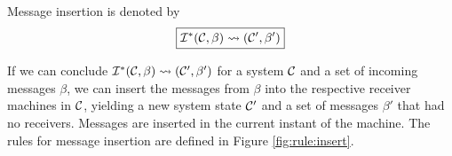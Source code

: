 \newpage

Message insertion is denoted by
\begin{equation*}
\boxed{\mathcal{I}^*(\mathcal{C}, \beta) \leadsto (\mathcal{C}', \beta')}
\end{equation*}

If we can conclude $\mathcal{I}^*(\mathcal{C}, \beta) \leadsto (\mathcal{C}', \beta')$ for a system $\mathcal{C}$ and
a set of incoming messages $\beta$, we can insert the messages from $\beta$
into the respective receiver machines in $\mathcal{C}$, yielding a new system state
$\mathcal{C}'$ and a set of messages $\beta'$ that had no receivers. Messages are
inserted in the current instant of the machine. The rules for message insertion
are defined in Figure \ref{fig:rule:insert}.

\begin{figure}[!ht]
\end{figure}

